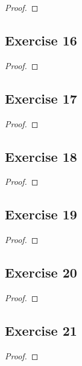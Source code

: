 \documentclass[14pt]{extarticle}
\begin{document}
\begin{proof}

\end{proof}

\subsection{Exercise 16}

\begin{proof}

\end{proof}

\subsection{Exercise 17}

\begin{proof}

\end{proof}

\subsection{Exercise 18}

\begin{proof}

\end{proof}

\subsection{Exercise 19}

\begin{proof}

\end{proof}

\subsection{Exercise 20}

\begin{proof}

\end{proof}

\subsection{Exercise 21}

\begin{proof}

\end{proof}
\end{document}
